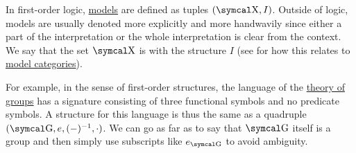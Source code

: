\begin{remark}\label{rem:first_order_model_notation}
  In first-order logic, \hyperref[def:first_order_semantics/satisfiability]{models} are defined as tuples \( (\CX, I) \). Outside of logic, models are usually denoted more explicitly and more handwavily since either a part of the interpretation or the whole interpretation is clear from the context. We say that the set \( \CX \) is  with the structure \( I \) (see  for how this relates to \hyperref[def:concrete_category]{model categories}).

  For example, in the sense of first-order structures, the language of the \hyperref[def:group/theory]{theory of groups} has a signature consisting of three functional symbols and no predicate symbols. A structure for this language is thus the same as a quadruple \( (\CG, e, (-)^{-1}, \cdot) \). We can go as far as to say that \( \CG \) itself is a group and then simply use subscripts like \( e_{\CG} \) to avoid ambiguity.
\end{remark}

